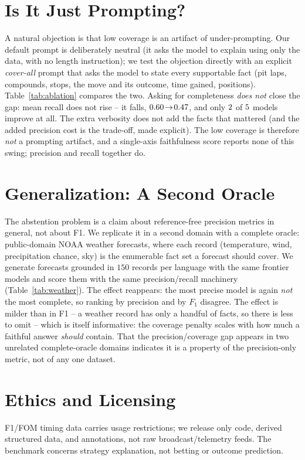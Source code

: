 \documentclass[11pt]{article}
\begin{document}
\section{Is It Just Prompting?}\label{sec:ablation}
A natural objection is that low coverage is an artifact of under-prompting. Our default
prompt is deliberately neutral (it asks the model to explain using only the data, with no
length instruction); we test the objection directly with an explicit \emph{cover-all}
prompt that asks the model to state every supportable fact (pit laps, compounds, stops,
the move and its outcome, time gained, positions). Table~\ref{tab:ablation} compares the
two. Asking for completeness \emph{does not} close the gap: mean recall does not rise --
it falls, $0.60{}\!\to\!0.47{}$, and only $2{}$ of
$5{}$ models improve at all. The extra verbosity does not add the facts that
mattered (and the added precision cost is the trade-off, made explicit). The low coverage
is therefore \emph{not} a prompting artifact, and a single-axis faithfulness score reports
none of this swing; precision and recall together do.

\section{Generalization: A Second Oracle}\label{sec:weather}
The abstention problem is a claim about reference-free precision metrics in general, not
about F1. We replicate it in a second domain with a complete oracle: public-domain NOAA
weather forecasts, where each record (temperature, wind, precipitation chance, sky) is the
enumerable fact set a forecast should cover. We generate forecasts grounded in $150$
records per language with the same frontier models and score them with the same
precision/recall machinery (Table~\ref{tab:weather}). The effect reappears: the most
precise model is again \emph{not} the most complete, so ranking by precision and by $F_1$
disagree. The effect is milder than in F1 -- a weather record has only a handful of facts,
so there is less to omit -- which is itself informative: the coverage penalty scales with
how much a faithful answer \emph{should} contain. That the precision/coverage gap appears
in two unrelated complete-oracle domains indicates it is a property of the precision-only
metric, not of any one dataset.

\section{Ethics and Licensing}\label{sec:ethics}
F1/FOM timing data carries usage restrictions; we release only code, derived
structured data, and annotations, not raw broadcast/telemetry feeds. The
benchmark concerns strategy explanation, not betting or outcome prediction.
\end{document}
